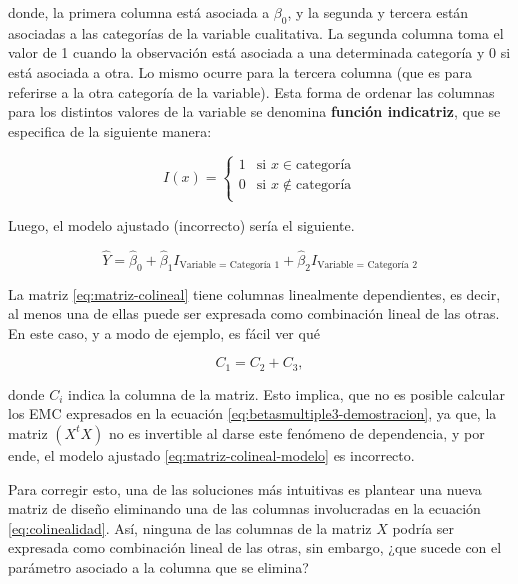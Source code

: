 \documentclass[
  11pt,
]{book}
\theoremstyle{definition}
\theoremstyle{definition}
\theoremstyle{definition}
\theoremstyle{definition}
\theoremstyle{remark}
\begin{document}
donde, la primera columna está asociada a \(\beta_0\), y la segunda y tercera están asociadas a las categorías de la variable cualitativa. La segunda columna toma el valor de 1 cuando la observación está asociada a una determinada categoría y 0 si está asociada a otra. Lo mismo ocurre para la tercera columna (que es para referirse a la otra categoría de la variable). Esta forma de ordenar las columnas para los distintos valores de la variable se denomina \textbf{función indicatriz}, que se especifica de la siguiente manera:

\begin{equation}
I(x) = \left\lbrace\begin{matrix}
1 & \text{si } x \in \text{categoría} \\
0 & \text{si } x \notin \text{categoría} \\
\end{matrix}
\right.
\label{eq:funcion-indicatriz}
\end{equation}

Luego, el modelo ajustado (incorrecto) sería el siguiente.

\begin{equation}
\widehat{Y} = \widehat{\beta}_0 + \widehat{\beta}_1I_{\text{Variable = Categoría 1}} + \widehat{\beta}_2I_{\text{Variable = Categoría 2}}
\label{eq:matriz-colineal-modelo}
\end{equation}

La matriz \eqref{eq:matriz-colineal} tiene columnas linealmente dependientes, es decir, al menos una de ellas puede ser expresada como combinación lineal de las otras. En este caso, y a modo de ejemplo, es fácil ver qué

\begin{equation}
C_1 = C_2 + C_3, 
\label{eq:colinealidad}
\end{equation}

donde \(C_i\) indica la columna de la matriz. Esto implica, que no es posible calcular los EMC expresados en la ecuación \eqref{eq:betasmultiple3-demostracion}, ya que, la matriz \((X^tX)\) no es invertible al darse este fenómeno de dependencia, y por ende, el modelo ajustado \eqref{eq:matriz-colineal-modelo} es incorrecto.

Para corregir esto, una de las soluciones más intuitivas es plantear una nueva matriz de diseño eliminando una de las columnas involucradas en la ecuación \eqref{eq:colinealidad}. Así, ninguna de las columnas de la matriz \(X\) podría ser expresada como combinación lineal de las otras, sin embargo, ¿que sucede con el parámetro asociado a la columna que se elimina?
\end{document}

